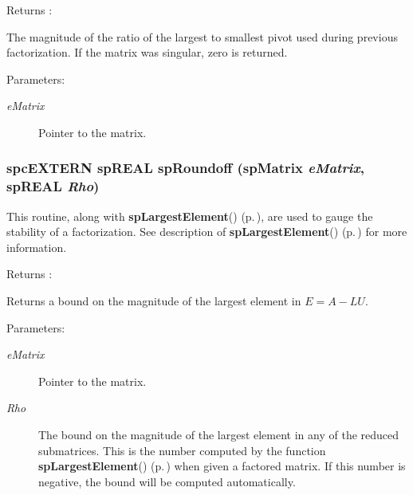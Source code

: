 \begin{Desc}
\item[Returns :]\par
 The magnitude of the ratio of the largest to smallest pivot used during previous factorization. If the matrix was singular, zero is returned.\end{Desc}
\begin{Desc}
\item[Parameters: ]\par
\begin{description}
\item[{\em 
e\-Matrix}]Pointer to the matrix. \end{description}
\end{Desc}
\subsubsection{\setlength{\rightskip}{0pt plus 5cm}spc\-EXTERN sp\-REAL sp\-Roundoff ({\bf sp\-Matrix} {\em e\-Matrix}, sp\-REAL {\em Rho})}\label{spMatrix_8h_a50}


This routine, along with {\bf sp\-Largest\-Element}() {\rm (p.\,\pageref{spMatrix_8h_a43})}, are used to gauge the stability of a factorization. See description of {\bf sp\-Largest\-Element}() {\rm (p.\,\pageref{spMatrix_8h_a43})} for more information.

\begin{Desc}
\item[Returns :]\par
 Returns a bound on the magnitude of the largest element in $ E = A - LU $.\end{Desc}
\begin{Desc}
\item[Parameters: ]\par
\begin{description}
\item[{\em 
e\-Matrix}]Pointer to the matrix. \item[{\em 
Rho}]The bound on the magnitude of the largest element in any of the reduced submatrices. This is the number computed by the function {\bf sp\-Largest\-Element}() {\rm (p.\,\pageref{spMatrix_8h_a43})} when given a factored matrix. If this number is negative, the bound will be computed automatically. \end{description}
\end{Desc}
